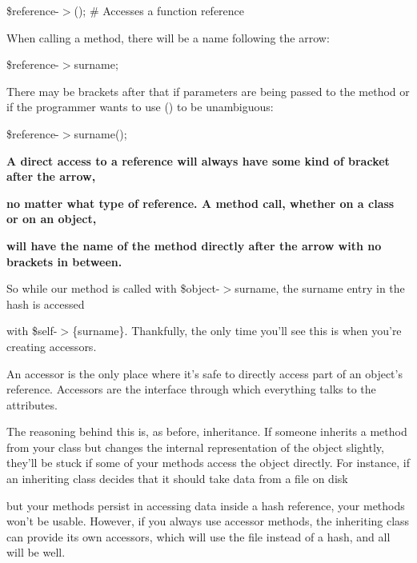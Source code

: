 \documentclass[a4paper,11pt]{book}
\begin{document}
\noindent \$reference-$>$(); \# Accesses a function reference

\noindent 

\noindent 

\noindent When calling a method, there will be a name following the arrow:

\noindent 

\noindent \$reference-$>$surname;

\noindent 

\noindent There may be brackets after that if parameters are being passed to the method or if the programmer wants to use () to be unambiguous:

\noindent 

\noindent \$reference-$>$surname();

\noindent 

\noindent 

\noindent \textbf{A direct access to a reference will always have some kind of bracket after the arrow,}

\noindent \textbf{no matter what type of reference. A method call, whether on a class or on an object,}

\noindent \textbf{will have the name of the method directly after the arrow with no brackets in between.}

\noindent 

\noindent 

\noindent So while our method is called with \$object-$>$surname, the surname entry in the hash is accessed

\noindent with \$self-$>$\{surname\}. Thankfully, the only time you'll see this is when you're creating accessors.

\noindent An accessor is the only place where it's safe to directly access part of an object's reference. Accessors are the interface through which everything talks to the attributes.

\noindent 

\noindent The reasoning behind this is, as before, inheritance. If someone inherits a method from your class but changes the internal representation of the object slightly, they'll be stuck if some of your methods access the object directly. For instance, if an inheriting class decides that it should take data from a file on disk

\noindent but your methods persist in accessing data inside a hash reference, your methods won't be usable. However, if you always use accessor methods, the inheriting class can provide its own accessors, which will use the file instead of a hash, and all will be well.
\end{document}
